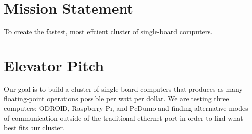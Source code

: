 
\section{Mission Statement}
To create the fastest, most effcient cluster of single-board computers.

\section{Elevator Pitch}
Our goal is to build a cluster of single-board computers that produces as many floating-point operations possible per watt per dollar. We are testing three computers:  ODROID, Raspberry Pi, and PcDuino and finding alternative modes of communication outside of the traditional ethernet port in order to find what best fits our cluster.
